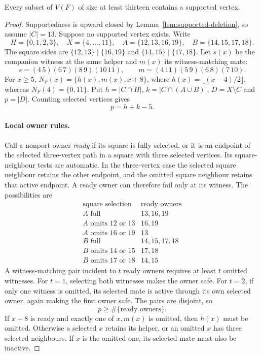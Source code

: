 \begin{lemma}\label{lem:twenty-support}
Every subset of $V(F)$ of size at least thirteen contains a supported vertex.
\end{lemma}
\begin{proof}
Supportedness is upward closed by Lemma~\ref{lem:supported-deletion}, so assume
$|C|=13$. Suppose no supported vertex exists. Write
\[
 H=\{0,1,2,3\},\quad X=\{4,\ldots,11\},\quad
 A=\{12,13,16,19\},\quad B=\{14,15,17,18\}.
\]
The square sides are $\{12,13\}\mid\{16,19\}$ and
$\{14,15\}\mid\{17,18\}$. Let $s(x)$ be the companion witness at the same
helper and $m(x)$ its witness-matching mate:
\[
 s=(4\,5)(6\,7)(8\,9)(10\,11),\qquad
 m=(4\,11)(5\,9)(6\,8)(7\,10).
\]
For $x\ge5$, $N_F(x)=\{h(x),m(x),x+8\}$, where
$h(x)=\lfloor(x-4)/2\rfloor$, whereas $N_F(4)=\{0,11\}$.
Put $h=|C\cap H|$, $k=|C\cap(A\cup B)|$, $D=X\setminus C$ and $p=|D|$.
Counting selected vertices gives
\begin{equation}\label{eq:twenty-budget}
 p=h+k-5.
\end{equation}

\paragraph{Local owner rules.}
Call a nonport owner \emph{ready} if its square is fully selected, or it is
an endpoint of the selected three-vertex path in a square with three
selected vertices. Its square-neighbour tests are automatic. In the
three-vertex case the selected square neighbour retains the other endpoint,
and the omitted square neighbour retains that active endpoint.
A ready owner can therefore fail only at its witness. The possibilities are
\[
\begin{array}{c|c}
\text{square selection}&\text{ready owners}\\\hline
A\text{ full}&13,16,19\\
A\text{ omits }12\text{ or }13&16,19\\
A\text{ omits }16\text{ or }19&13\\
B\text{ full}&14,15,17,18\\
B\text{ omits }14\text{ or }15&17,18\\
B\text{ omits }17\text{ or }18&14,15
\end{array}
\]
A witness-matching pair incident to $t$ ready owners requires at least $t$
omitted witnesses. For $t=1$, selecting both witnesses makes the owner safe.
For $t=2$, if only one witness is omitted, its selected mate is active through
its own selected owner, again making the first owner safe. The pairs are
disjoint, so
\begin{equation}\label{eq:twenty-ready}
 p\ge\#\{\text{ready owners}\}.
\end{equation}
If $x+8$ is ready and exactly one of $x,m(x)$ is omitted, then $h(x)$ must
be omitted. Otherwise a selected $x$ retains its helper, or an omitted $x$
has three selected neighbours. If $x$ is the omitted one, its selected mate
must also be inactive.


\end{proof}
